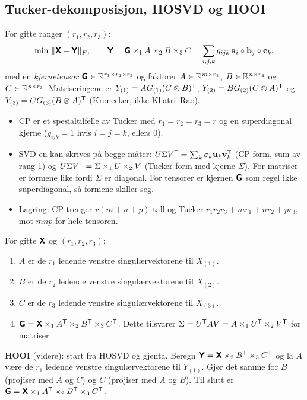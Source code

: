 \subsection{Tucker-dekomposisjon, HOSVD og HOOI}
\begin{defn}[Tucker]
For gitte ranger $(r_1,r_2,r_3)$:
\[
\min\ \lVert \bm{\mathsf{X}}-\bm{\mathsf{Y}}\rVert_F,\qquad \bm{\mathsf{Y}}=\bm{\mathsf{G}}\times_1A\times_2B\times_3C=\sum_{i,j,k}g_{ijk}\,\mathbf{a}_i\circ\mathbf{b}_j\circ\mathbf{c}_k,
\]
med en \emph{kjernetensor} $\bm{\mathsf{G}}\in\mathbb{R}^{r_1\times r_2\times r_3}$ og faktorer $A\in\mathbb{R}^{m\times r_1}$, $B\in\mathbb{R}^{n\times r_2}$ og $C\in\mathbb{R}^{p\times r_3}$. Matriseringene er $Y_{(1)}=AG_{(1)}(C\otimes B)^{\mathsf{T}}$, $Y_{(2)}=BG_{(2)}(C\otimes A)^{\mathsf{T}}$ og $Y_{(3)}=CG_{(3)}(B\otimes A)^{\mathsf{T}}$ (Kronecker, ikke Khatri--Rao).
\end{defn}
\begin{teorem}
\begin{itemize}
  \item CP er et spesialtilfelle av Tucker med $r_1=r_2=r_3=r$ og en superdiagonal kjerne ($g_{ijk}=1$ hvis $i=j=k$, ellers $0$).
  \item SVD-en kan skrives på begge måter: $U\Sigma V^{\mathsf{T}}=\sum_k\sigma_k\mathbf{u}_k\mathbf{v}_k^{\mathsf{T}}$ (CP-form, sum av rang-1) og $U\Sigma V^{\mathsf{T}}=\Sigma\times_1U\times_2V$ (Tucker-form med kjerne $\Sigma$). For matriser er formene like fordi $\Sigma$ er diagonal. For tensorer er kjernen $\bm{\mathsf{G}}$ som regel ikke superdiagonal, så formene skiller seg.
  \item Lagring: CP trenger $r(m+n+p)$ tall og Tucker $r_1r_2r_3+mr_1+nr_2+pr_3$, mot $mnp$ for hele tensoren.
\end{itemize}
\end{teorem}
\begin{oppskrift}
For gitte $\bm{\mathsf{X}}$ og $(r_1,r_2,r_3)$:
\begin{enumerate}
  \item $A$ er de $r_1$ ledende venstre singulærvektorene til $X_{(1)}$.
  \item $B$ er de $r_2$ ledende venstre singulærvektorene til $X_{(2)}$.
  \item $C$ er de $r_3$ ledende venstre singulærvektorene til $X_{(3)}$.
  \item $\bm{\mathsf{G}}=\bm{\mathsf{X}}\times_1A^{\mathsf{T}}\times_2B^{\mathsf{T}}\times_3C^{\mathsf{T}}$. Dette tilsvarer $\Sigma=U^{\mathsf{T}} AV=A\times_1U^{\mathsf{T}}\times_2V^{\mathsf{T}}$ for matriser.
\end{enumerate}
\textbf{HOOI} (videre): start fra HOSVD og gjenta. Beregn $\bm{\mathsf{Y}}=\bm{\mathsf{X}}\times_2B^{\mathsf{T}}\times_3C^{\mathsf{T}}$ og la $A$ være de $r_1$ ledende venstre singulærvektorene til $Y_{(1)}$. Gjør det samme for $B$ (projiser med $A$ og $C$) og $C$ (projiser med $A$ og $B$). Til slutt er $\bm{\mathsf{G}}=\bm{\mathsf{X}}\times_1A^{\mathsf{T}}\times_2B^{\mathsf{T}}\times_3C^{\mathsf{T}}$.
\end{oppskrift}



